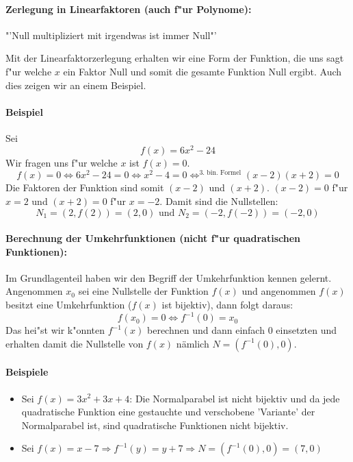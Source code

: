\paragraph{Zerlegung in Linearfaktoren (auch f"ur Polynome):}
\begin{center}
"'Null multipliziert mit irgendwas ist immer Null"'
\end{center}
Mit der Linearfaktorzerlegung erhalten wir eine Form der Funktion, die uns sagt f"ur welche $x$ ein Faktor Null und somit die gesamte Funktion Null ergibt. Auch dies zeigen wir an einem Beispiel.

\paragraph{Beispiel}
Sei
\begin{equation*}
f(x) = 6x^2 - 24
\end{equation*}
Wir fragen uns f"ur welche $x$ ist $f(x) = 0$.
\begin{equation*}
f(x) = 0 \iff 6x^2 - 24 = 0 \iff x^2 - 4 = 0 \iff^{\text{3. bin. Formel}} (x-2)(x+2) = 0 
\end{equation*}
Die Faktoren der Funktion sind somit $(x-2)$ und $(x+2)$. $(x-2) = 0$ f"ur $x = 2$ und $(x+2) = 0$ f"ur  $x = -2$. Damit sind die Nullstellen:
\begin{equation*}
N_1 = (2, f(2)) = (2, 0) \text{ und } N_2 = (-2, f(-2)) = (-2, 0)
\end{equation*}

\paragraph{Berechnung der Umkehrfunktionen (nicht f"ur quadratischen Funktionen):}
Im Grundlagenteil haben wir den Begriff der Umkehrfunktion kennen gelernt. Angenommen $x_0$ sei eine Nullstelle der Funktion $f(x)$ und angenommen $f(x)$ besitzt eine Umkehrfunktion ($f(x)$ ist bijektiv), dann folgt daraus:
\begin{equation*}
f(x_0) = 0 \iff f^{-1}(0) = x_0
\end{equation*}
Das hei"st wir k"onnten $f^{-1}(x)$ berechnen und dann einfach $0$ einsetzten und erhalten damit die Nullstelle von $f(x)$ nämlich $N = (f^{-1}(0), 0)$.

\paragraph{Beispiele}
\begin{itemize}
\item Sei $f(x) = 3x^2 + 3x + 4$: Die Normalparabel ist nicht bijektiv und da jede quadratische Funktion eine gestauchte und verschobene 'Variante' der Normalparabel ist, sind quadratische Funktionen nicht bijektiv.
\item Sei $f(x) = x - 7 \Rightarrow f^{-1}(y) = y + 7 \Rightarrow N = (f^{-1}(0), 0) = (7, 0)$
\end{itemize}

